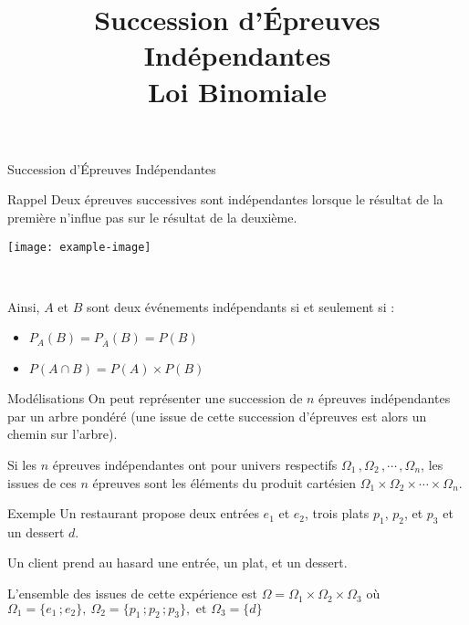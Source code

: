 \documentclass{cours}
\title{Succession d'Épreuves Indépendantes \\ Loi Binomiale}
\begin{document}

    \begin{Gpartie}{Succession d'Épreuves Indépendantes} 
        \begin{Spartie}{Rappel} 
            Deux épreuves successives sont indépendantes lorsque le résultat de la première n'influe pas sur le résultat de la deuxième.

            \begin{center}
                    \texttt{[image: example-image]}
                \parbox{\linewidth}{} \\[2ex]
            \end{center}
            Ainsi, $A$ et $B$ sont deux événements indépendants si et seulement si :
            \begin{itemize}
                \item $P_A(B)=P_{\overline{A}}(B)=P(B)$
                \item $P(A\cap B)=P(A)\times P(B)$
            \end{itemize}
        \end{Spartie}
        \pagebreak
        \begin{Spartie}{Modélisations} 
            On peut représenter une succession de $n$ épreuves indépendantes par un arbre pondéré (une issue de cette succession d'épreuves est alors un chemin sur l'arbre).

            Si les $n$ épreuves indépendantes ont pour univers respectifs $\Omega_1\,,\Omega_2\,,\dotsb\,,\Omega_n$, les issues de ces $n$ épreuves sont les éléments du produit cartésien $\Omega_1\times\Omega_2\times\dotsb\times\Omega_n$.
        \end{Spartie}
        \begin{Spartie}{Exemple} 
            Un restaurant propose deux entrées $e_1$ et $e_2$, trois plats $p_1$, $p_2$, et $p_3$ et un dessert $d$.

            Un client prend au hasard une entrée, un plat, et un dessert.

            L'ensemble des issues de cette expérience est $\Omega=\Omega_1\times\Omega_2\times\Omega_3$ où $\Omega_1=\big\{e_1\,; e_2\big\},\ \Omega_2=\big\{p_1\,; p_2\,; p_3\big\},\text{ et }\Omega_3=\big\{d\big\}$


\end{Spartie}
\end{Gpartie}
\end{document}
